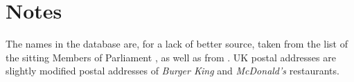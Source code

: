 \documentclass[10pt]{report}
\begin{document}
\chapter{Notes}
\thispagestyle{fancy}

The names in the database are, for a lack of better source, taken from the list of the sitting Members of Parliament \cite{mps}, as well as from \cite{minarcsys}.  UK postal addresses are slightly modified postal addresses of {\em Burger King} \cite{burgerking} and {\em McDonald's} \cite{mcdonalds} restaurants.

\renewcommand\bibname{Bibliography and Data Sources}

\thispagestyle{fancy}
\end{document}
